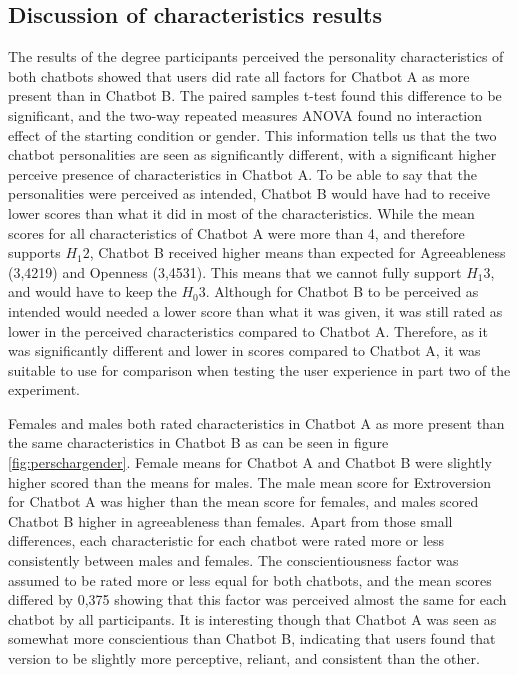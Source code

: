 \subsection{Discussion of characteristics results}
The results of the degree participants perceived the personality characteristics of both chatbots showed that users did rate all factors for Chatbot A as more present than in Chatbot B. The paired samples t-test found this difference to be significant, and the two-way repeated measures ANOVA found no interaction effect of the starting condition or gender. This information tells us that the two chatbot personalities are seen as significantly different, with a significant higher perceive presence of characteristics in Chatbot A. To be able to say that the personalities were perceived as intended, Chatbot B would have had to receive lower scores than what it did in most of the characteristics. While the mean scores for all characteristics of Chatbot A were more than 4, and therefore supports $H_1 2$, Chatbot B received higher means than expected for Agreeableness (3,4219) and Openness (3,4531). This means that we cannot fully support $H_1 3$, and would have to keep the $H_0 3$. Although for Chatbot B to be perceived as intended would needed a lower score than what it was given, it was still rated as lower in the perceived characteristics compared to Chatbot A. Therefore, as it was significantly different and lower in scores compared to Chatbot A, it was suitable to use for comparison when testing the user experience in part two of the experiment.

Females and males both rated characteristics in Chatbot A as more present than the same characteristics in Chatbot B as can be seen in figure \ref{fig:perschargender}. Female means for Chatbot A and Chatbot B were slightly higher scored than the means for males. The male mean score for Extroversion for Chatbot A was higher than the mean score for females, and males scored Chatbot B higher in agreeableness than females. Apart from those small differences, each characteristic for each chatbot were rated more or less consistently between males and females. The conscientiousness factor was assumed to be rated more or less equal for both chatbots, and the mean scores differed by 0,375 showing that this factor was perceived almost the same for each chatbot by all participants. It is interesting though that Chatbot A was seen as somewhat more conscientious than Chatbot B, indicating that users found that version to be slightly more perceptive, reliant, and consistent than the other.  


